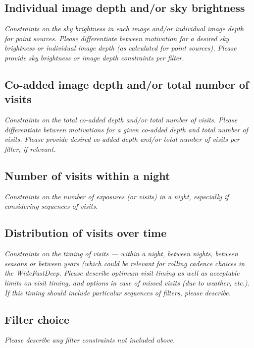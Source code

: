 \documentclass[11pt]{article}
\begin{document}
\subsection{Individual image depth and/or sky brightness}
\begin{footnotesize}{\it Constraints on the sky brightness in each image and/or individual image depth for point sources.
Please differentiate between motivation for a desired sky brightness or individual image depth (as 
calculated for point sources). Please provide sky brightness or image depth constraints per filter.}
\end{footnotesize}

\subsection{Co-added image depth and/or total number of visits}
\begin{footnotesize}{\it  Constraints on the total co-added depth and/or total number of visits.
Please differentiate between motivations for a given co-added depth and total number of visits. 
Please provide desired co-added depth and/or total number of visits per filter, if relevant.}
\end{footnotesize}

\subsection{Number of visits within a night}
\begin{footnotesize}{\it Constraints on the number of exposures (or visits) in a night, especially if considering sequences of visits.  }
\end{footnotesize}

\subsection{Distribution of visits over time}
\begin{footnotesize}{\it Constraints on the timing of visits --- within a night, between nights, between seasons or
between years (which could be relevant for rolling cadence choices in the WideFastDeep. 
Please describe optimum visit timing as well as acceptable limits on visit timing, and options in
case of missed visits (due to weather, etc.). If this timing should include particular sequences
of filters, please describe.}
\end{footnotesize}

\subsection{Filter choice}
\begin{footnotesize}
{\it Please describe any filter constraints not included above.}
\end{footnotesize}
\end{document}
